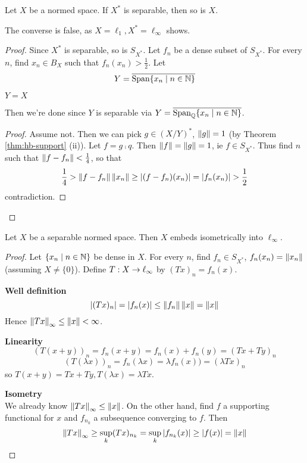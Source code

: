 \documentclass{article}
\begin{document}
\begin{nthm}
  Let $X$ be a normed space. If $X^*$ is separable, then so is $X$.
\end{nthm}
\begin{rmk}
  The converse is false, as $X = \ell_1, X^* = \ell_\infty$ shows.
\end{rmk}
\begin{proof}
  Since $X^*$ is separable, so is $S_{X^*}$. Let $f_n$ be a dense subset of $S_{X^*}$. For every $n$, find $x_n \in B_X$ such that $f_n(x_n) > \frac 12$. Let
  $$Y = \overline{\operatorname{Span}\{x_n \mid n \in \mathbb N\}}$$
  \begin{claim}
    $Y = X$
  \end{claim}
  Then we're done since $Y$ is separable via $Y = \overline{\operatorname{Span}_\mathbb Q\{x_n \mid n \in \mathbb N\}}$.
  \begin{proof}
    Assume not. Then we can pick $g \in (X/Y)^*$, $\left\lVert g\right\rVert = 1$ (by Theorem \ref{thm:hb-support} (ii)). Let $f = g \comp q$. Then $\left\lVert f\right\rVert = \left\lVert g\right\rVert = 1$, ie $f \in S_{X^*}$. Thus find $n$ such that $\left\lVert f - f_n\right\rVert < \frac 14$, so that
    $$\frac 14 > \left\lVert f - f_n\right\rVert\left\lVert x_n\right\rVert \ge \left\lvert (f - f_n)(x_n)\right\rvert = \left\lvert f_n(x_n)\right\rvert > \frac 12$$
    contradiction.
  \end{proof}
\end{proof}

\begin{nthm}
  Let $X$ be a separable normed space. Then $X$ embeds isometrically into $\ell_\infty$.
\end{nthm}
\begin{proof}
  Let $\{x_n \mid n \in \mathbb N\}$ be dense in $X$. For every $n$, find $f_n \in S_{X^*}$, $f_n(x_n) = \left\lVert x_n\right\rVert$ (assuming $X \ne \{0\}$). Define $T : X \rightarrow \ell_\infty$ by $(Tx)_n = f_n(x)$.

  {\bf Well definition}
  $$ \left\lvert (Tx)_n\right\rvert = \left\lvert f_n(x)\right\rvert \le \left\lVert f_n\right\rVert\left\lVert x\right\rVert = \left\lVert x\right\rVert$$
  Hence $\left\lVert Tx\right\rVert_\infty \le \left\lVert x\right\rVert < \infty$.

  {\bf Linearity}
  $$ (T(x + y))_n = f_n(x + y) = f_n(x) + f_n(y) = (Tx + Ty)_n$$
  $$ (T(\lambda x))_n = f_n(\lambda x) = \lambda f_n(x)) = (\lambda Tx)_n$$
  so $T(x + y) = Tx + Ty, T(\lambda x) = \lambda Tx$.

  {\bf Isometry} \\
  We already know $\left\lVert Tx\right\rVert_\infty \le \left\lVert x\right\rVert$. On the other hand, find $f$ a supporting functional for $x$ and $f_{n_k}$ a subsequence converging to $f$. Then
  $$\left\lVert Tx\right\rVert_\infty \ge \sup_k (Tx)_{n_k} = \sup_k \left\lvert f_{n_k}(x)\right\rvert \ge \left\lvert f(x)\right\rvert = \left\lVert x\right\rVert$$
\end{proof}
\end{document}
